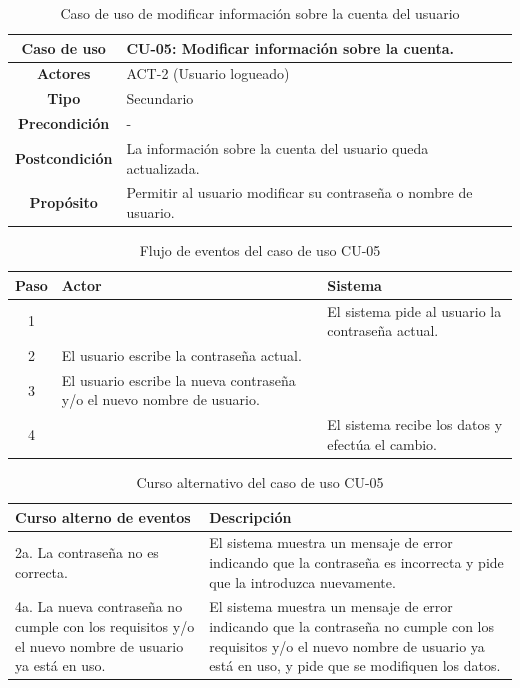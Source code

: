 \begin{table}[H]
\centering
\begin{tabular}{|c|p{10cm}|}
\hline
\rowcolor{green!40} \textbf{Caso de uso} & CU-05: Modificar información sobre la cuenta. \\ \hline
\rowcolor{blue!10} \textbf{Actores} & ACT-2 (Usuario logueado) \\ \hline
\rowcolor{blue!10} \textbf{Tipo} & Secundario \\ \hline
\rowcolor{blue!10} \textbf{Precondición} & - \\ \hline
\rowcolor{blue!10} \textbf{Postcondición} & La información sobre la cuenta del usuario queda actualizada. \\ \hline
\rowcolor{blue!10} \textbf{Propósito} & Permitir al usuario modificar su contraseña o nombre de usuario. \\ \hline
\end{tabular}
\caption{Caso de uso de modificar información sobre la cuenta del usuario}
\end{table}

\begin{table}[H]
\centering
\begin{tabular}{|c|p{5cm}|p{5cm}|}
\hline
\rowcolor{green!40} \textbf{Paso} & \textbf{Actor} & \textbf{Sistema} \\ \hline
\rowcolor{blue!10} 1 &  & El sistema pide al usuario la contraseña actual. \\ \hline
\rowcolor{blue!10} 2 & El usuario escribe la contraseña actual. & \\ \hline
\rowcolor{blue!10} 3 & El usuario escribe la nueva contraseña y/o el nuevo nombre de usuario. & \\ \hline
\rowcolor{blue!10} 4 &  & El sistema recibe los datos y efectúa el cambio. \\ \hline
\end{tabular}
\caption{Flujo de eventos del caso de uso CU-05}
\end{table}

\begin{table}[H]
\centering
\begin{tabular}{|p{4cm}|p{8cm}|}
\hline
\rowcolor{green!40} \textbf{Curso alterno de eventos} & \textbf{Descripción} \\ \hline
\rowcolor{blue!10} 2a. La contraseña no es correcta. & El sistema muestra un mensaje de error indicando que la contraseña es incorrecta y pide que la introduzca nuevamente. \\ \hline
\rowcolor{blue!10} 4a. La nueva contraseña no cumple con los requisitos y/o el nuevo nombre de usuario ya está en uso. & El sistema muestra un mensaje de error indicando que la contraseña no cumple con los requisitos y/o el nuevo nombre de usuario ya está en uso, y pide que se modifiquen los datos. \\ \hline
\end{tabular}
\caption{Curso alternativo del caso de uso CU-05}
\end{table}

